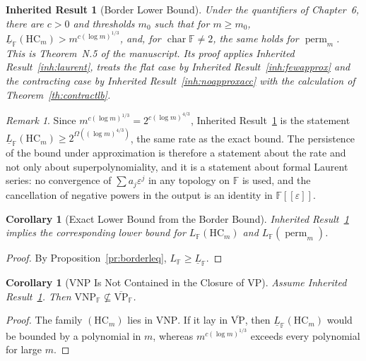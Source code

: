 \documentclass[11pt,letterpaper]{report}
\theoremstyle{plain}
\newtheorem{corollary}[theorem]{Corollary}
\newtheorem{inherited}[theorem]{Inherited Result}
\theoremstyle{definition}
\theoremstyle{remark}
\newtheorem{remark}[theorem]{Remark}
\DeclareMathOperator{\perm}{perm}
\newcommand{\VP}{\mathrm{VP}}
\newcommand{\VNP}{\mathrm{VNP}}
\begin{document}
\begin{inherited}[Border Lower Bound]\label{inh:border}
Under the quantifiers of Chapter~6, there are $c>0$ and thresholds $m_0$ such that for $m\ge m_0$, $\underline L_{\mathbb F}(\mathrm{HC}_m)>m^{c(\log m)^{1/3}}$, and, for $\operatorname{char}\mathbb F\ne2$, the same holds for $\perm_m$. This is Theorem~N.5 of the manuscript. Its proof applies Inherited Result~\ref{inh:laurent}, treats the flat case by Inherited Result~\ref{inh:fewapprox} and the contracting case by Inherited Result~\ref{inh:noapproxacc} with the calculation of Theorem~\ref{th:contractlb}.
\end{inherited}

\begin{remark}
Since $m^{c(\log m)^{1/3}}=2^{c(\log m)^{4/3}}$, Inherited Result~\ref{inh:border} is the statement $\underline L_{\mathbb F}(\mathrm{HC}_m)\ge2^{\Omega((\log m)^{4/3})}$, the same rate as the exact bound. The persistence of the bound under approximation is therefore a statement about the rate and not only about superpolynomiality, and it is a statement about formal Laurent series: no convergence of $\sum a_j\varepsilon^j$ in any topology on $\mathbb F$ is used, and the cancellation of negative powers in the output is an identity in $\mathbb F[[\varepsilon]]$.
\end{remark}

\begin{corollary}[Exact Lower Bound from the Border Bound]
Inherited Result~\ref{inh:border} implies the corresponding lower bound for $L_{\mathbb F}(\mathrm{HC}_m)$ and $L_{\mathbb F}(\perm_m)$.
\end{corollary}
\begin{proof}
By Proposition~\ref{pr:borderleq}, $L_{\mathbb F}\ge\underline L_{\mathbb F}$.
\end{proof}

\begin{corollary}[VNP Is Not Contained in the Closure of VP]\label{co:vnpclosure}
Assume Inherited Result~\ref{inh:border}. Then $\VNP_{\mathbb F}\not\subseteq\overline{\VP}_{\mathbb F}$.
\end{corollary}
\begin{proof}
The family $(\mathrm{HC}_m)$ lies in $\VNP$. If it lay in $\overline{\VP}$, then $\underline L_{\mathbb F}(\mathrm{HC}_m)$ would be bounded by a polynomial in $m$, whereas $m^{c(\log m)^{1/3}}$ exceeds every polynomial for large $m$.
\end{proof}
\end{document}
